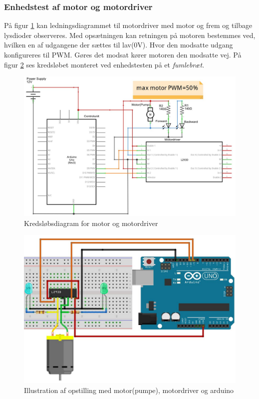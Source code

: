 \subsubsection{Enhedstest af motor og motordriver}
\label{subsubsec:enhedstestmotor}
 På figur \ref{fig:motordriverdiagram} kan ledningsdiagrammet til motordriver med motor og frem og tilbage lysdioder observeres. Med opsætningen kan retningen på motoren bestemmes ved, hvilken en af udgangene der sættes til lav(0V). Hvor den modsatte udgang konfigureres til PWM. Gøres det modsat kører motoren den modsatte vej. På figur \ref{fig:Motorbreadboard} ses kredsløbet monteret ved enhedstesten på et \textit{fumlebræt}.
 
 \begin{figure}[H]
	\centering
	\includegraphics[width=1\textwidth]{billeder/Hardware/diagrammer/motordiagram.JPG}
	\caption{Kredsløbsdiagram for motor og motordriver}
	\label{fig:motordriverdiagram}
\end{figure}

 \begin{figure}[H]
	\centering
	\includegraphics[width=1\textwidth]{billeder/Hardware/diagrammer/Motorbreadboard.JPG}
	\caption{Illustration af opstilling med motor(pumpe), motordriver og arduino}
	\label{fig:Motorbreadboard}
\end{figure}

